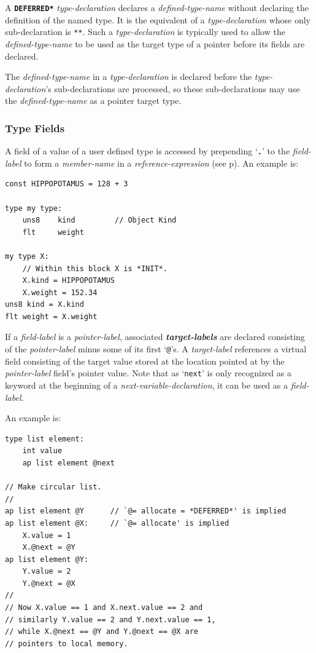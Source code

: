 \documentclass[12pt]{article}
\newcommand{\TT}[1]{{\tt \bfseries #1}}
\newcommand{\ttkey}[1]{{\tt \bfseries #1}}
\newcommand{\emkey}[1]{{\em \bfseries #1}}
\newcommand{\pagref}[1]{p\pageref{#1}}
\newenvironment{indpar}[1][0.3in]%
	{\begin{list}{}%
		     {\setlength{\itemsep}{0in}%
		      \setlength{\topsep}{0in}%
		      \setlength{\parsep}{1ex}%
		      \setlength{\labelwidth}{#1}%
		      \setlength{\leftmargin}{#1}%
		      \addtolength{\leftmargin}{\labelsep}}%
	 \item}%
	{\end{list}}
\begin{document}
A \ttkey{*DEFERRED*} {\em type-declaration} declares a {\em defined-type-name}
without declaring the definition of the named type.
It is the equivalent of a {\em type-declaration} whose only sub-declaration
is {\tt ***}.
Such a {\em type-declaration} is typically used to allow the
{\em defined-type-name}
to be used as the target type of a pointer before its fields are declared.

The {\em defined-type-name} in a {\em type-declaration} is declared before
the {\em type-declaration}'s sub-declarations are processed, so these
sub-declarations may use the {\em defined-type-name} as a pointer target type.

\subsubsection{Type Fields}

A field of a value of a user defined type is accessed by prepending
`\TT{.}' to the {\em field-label} to form a {\em member-name} in
a {\em reference-expression} (see \pagref{RUN-TIME-FIELD-SELECTION}).
An example is:

\begin{indpar}\begin{verbatim}
const HIPPOPOTAMUS = 128 + 3

type my type:
    uns8    kind         // Object Kind
    flt     weight

my type X:
    // Within this block X is *INIT*.
    X.kind = HIPPOPOTAMUS
    X.weight = 152.34
uns8 kind = X.kind
flt weight = X.weight
\end{verbatim}\end{indpar}

If a {\em field-label} is a {\em pointer-label},
associated \emkey{target-labels} are declared consisting of the
{\em pointer-label} minus some of its first `{\tt @}'s.
A {\em target-label}
references a virtual field consisting of the target value stored
at the location pointed at by the {\em pointer-label} field's pointer value.
Note that as `{\tt next}' is only recognized as a keyword at the beginning
of a {\em next-variable-declaration}, it can be used as a 
{\em field-label}.

An example is:

\begin{indpar}\begin{verbatim}
type list element:
    int value
    ap list element @next

// Make circular list.
//
ap list element @Y      // `@= allocate = *DEFERRED*' is implied
ap list element @X:     // `@= allocate' is implied
    X.value = 1
    X.@next = @Y
ap list element @Y:
    Y.value = 2
    Y.@next = @X
//
// Now X.value == 1 and X.next.value == 2 and
// similarly Y.value == 2 and Y.next.value == 1,
// while X.@next == @Y and Y.@next == @X are
// pointers to local memory.
\end{verbatim}\end{indpar}
\end{document}
